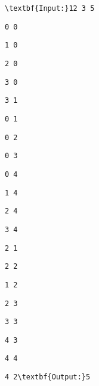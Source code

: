\begin{verbatim}
\textbf{Input:}12 3 5 \end{verbatim}
\begin{verbatim}
0 0 \end{verbatim}
\begin{verbatim}
1 0 \end{verbatim}
\begin{verbatim}
2 0 \end{verbatim}
\begin{verbatim}
3 0 \end{verbatim}
\begin{verbatim}
3 1 \end{verbatim}
\begin{verbatim}
0 1 \end{verbatim}
\begin{verbatim}
0 2 \end{verbatim}
\begin{verbatim}
0 3 \end{verbatim}
\begin{verbatim}
0 4 \end{verbatim}
\begin{verbatim}
1 4 \end{verbatim}
\begin{verbatim}
2 4 \end{verbatim}
\begin{verbatim}
3 4 \end{verbatim}
\begin{verbatim}
2 1 \end{verbatim}
\begin{verbatim}
2 2 \end{verbatim}
\begin{verbatim}
1 2 \end{verbatim}
\begin{verbatim}
2 3 \end{verbatim}
\begin{verbatim}
3 3 \end{verbatim}
\begin{verbatim}
4 3 \end{verbatim}
\begin{verbatim}
4 4 \end{verbatim}
\begin{verbatim}
4 2\textbf{Output:}5\end{verbatim}
\begin{verbatim}

\end{verbatim}
